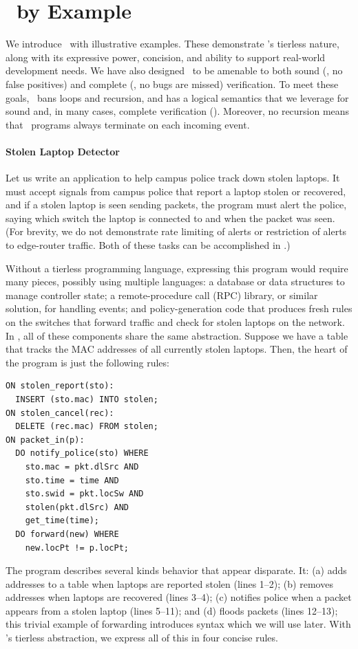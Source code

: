 
\section{\flowlog\ by Example}
\label{sec:examples}

We introduce \flowlog\ with illustrative examples. These demonstrate
\flowlog's tierless nature, along with its expressive power, concision, and
ability to support real-world development needs. We have also designed
\flowlog\ to be amenable to both sound (\ie, no false positives) and complete 
(\ie, no bugs are missed) verification. To meet these goals, \flowlog\ bans
loops and recursion, and has a logical semantics that we leverage for sound
and, in many cases, complete verification (). Moreover, no
recursion means that \flowlog\ programs always terminate on each incoming event.

\paragraph{Stolen Laptop Detector}

Let us write an application to help campus
police track down stolen laptops. It must accept signals from campus
police that report a laptop stolen or recovered, and if a stolen
laptop is seen sending packets, the program must alert the police, saying which
switch the laptop is connected to and when the packet was seen. (For
brevity, we do not demonstrate rate limiting of alerts or restriction of alerts to edge-router traffic.
Both of these tasks can be accomplished in \flowlog.)

Without a tierless programming language, expressing this program would require
many pieces, possibly using multiple languages: a database or
data structures to manage controller state; a remote-procedure call (RPC)
library, or similar solution, for handling events; and policy-generation code
that produces fresh rules on the switches that forward traffic and check for
stolen laptops on the network. In \flowlog, all of these components share the
same abstraction. Suppose we have a table  that tracks the MAC
addresses of all currently stolen laptops. Then, the heart of the program is
just the following rules:
\begin{lstlisting}[label=list:1]
ON stolen_report(sto):
  INSERT (sto.mac) INTO stolen;
ON stolen_cancel(rec):
  DELETE (rec.mac) FROM stolen;
ON packet_in(p): 
  DO notify_police(sto) WHERE 
    sto.mac = pkt.dlSrc AND 
    sto.time = time AND 
    sto.swid = pkt.locSw AND
    stolen(pkt.dlSrc) AND 
    get_time(time);    
  DO forward(new) WHERE 
    new.locPt != p.locPt;    
\end{lstlisting}
The program describes several kinds behavior that appear disparate. It: (a)
adds addresses to a table when laptops are reported stolen (lines 1--2); (b)
removes addresses when laptops are recovered (lines 3--4); (c) notifies police
when a packet appears from a stolen laptop (lines 5--11); and (d) floods packets (lines 12--13); 
this trivial example of forwarding introduces syntax which we will use later. With \flowlog's tierless abstraction,
we express all of this in four concise rules.

